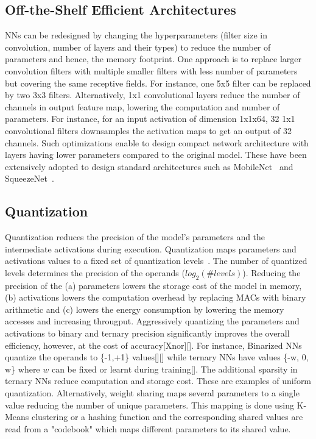 \subsection{Off-the-Shelf Efficient Architectures} 
NNs can be redesigned by changing the hyperparameters (filter size in convolution, number of layers and their types) to reduce the number of parameters and hence, the memory footprint.
One approach is to replace larger convolution filters with multiple smaller filters with less number of parameters but covering the same receptive fields.
For instance, one 5x5 filter can be replaced by two 3x3 filters.
Alternatively, 1x1 convolutional layers reduce the number of channels in output feature map, lowering the computation and number of parameters.
For instance, for an input activation of dimension 1x1x64, 32 1x1 convolutional filters downsamples the activation maps to get an output of 32 channels.
Such optimizations enable to design compact network architecture with layers having lower parameters compared to the original model.
These have been extensively adopted to design standard architectures such as MobileNet~\cite{conf/cvpr/SandlerHZZC18} and SqueezeNet~\cite{DBLP:journals/corr/IandolaMAHDK16}.


\subsection{Quantization}
Quantization reduces the precision of the model's parameters and the intermediate activations during execution.
Quantization maps parameters and activations values to a fixed set of quantization levels~\cite{Hubara:2017:QNN:3122009.3242044}.
The number of quantized levels determines the precision of the operands ($log_2(\#levels)$).
Reducing the precision of the (a) parameters lowers the storage cost of the model in memory, (b) activations lowers the computation overhead by replacing MACs with binary arithmetic and (c) lowers the energy consumption by lowering the memory accesses and increasing througput.
Aggressively quantizing the parameters and activations to binary and ternary precision significantly improves the overall efficiency, however, at the cost of accuracy[Xnor][].
For instance, Binarized NNs quantize the operands to \{-1,+1\} values[][] while ternary NNs have values \{-w, 0, w\} where $w$ can be fixed or learnt during training[].
The additional sparsity in ternary NNs reduce computation and storage cost. These are examples of uniform quantization.
Alternatively, weight sharing maps several parameters to a single value reducing the number of unique parameters.
This mapping is done using K-Means clustering or a hashing function and the corresponding shared values are read from a "codebook" which maps different parameters to its shared value.



